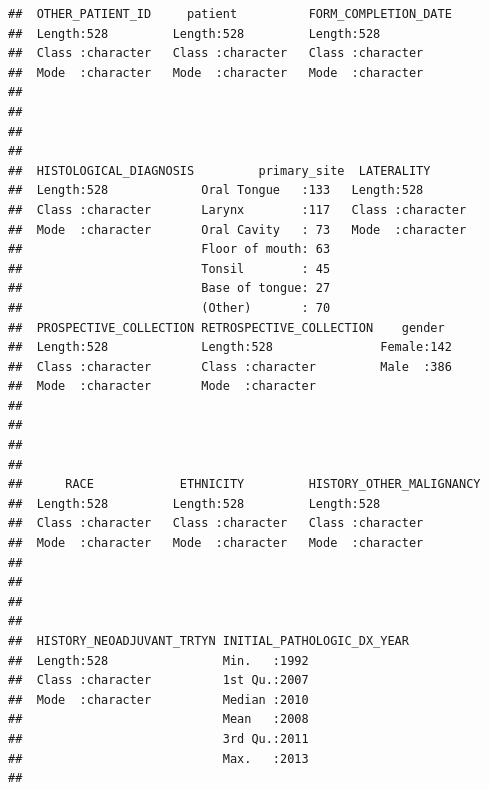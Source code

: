 \documentclass[
  11pt,
]{article}
\begin{document}
\begin{verbatim}
##  OTHER_PATIENT_ID     patient          FORM_COMPLETION_DATE
##  Length:528         Length:528         Length:528          
##  Class :character   Class :character   Class :character    
##  Mode  :character   Mode  :character   Mode  :character    
##                                                            
##                                                            
##                                                            
##                                                            
##  HISTOLOGICAL_DIAGNOSIS         primary_site  LATERALITY       
##  Length:528             Oral Tongue   :133   Length:528        
##  Class :character       Larynx        :117   Class :character  
##  Mode  :character       Oral Cavity   : 73   Mode  :character  
##                         Floor of mouth: 63                     
##                         Tonsil        : 45                     
##                         Base of tongue: 27                     
##                         (Other)       : 70                     
##  PROSPECTIVE_COLLECTION RETROSPECTIVE_COLLECTION    gender   
##  Length:528             Length:528               Female:142  
##  Class :character       Class :character         Male  :386  
##  Mode  :character       Mode  :character                     
##                                                              
##                                                              
##                                                              
##                                                              
##      RACE            ETHNICITY         HISTORY_OTHER_MALIGNANCY
##  Length:528         Length:528         Length:528              
##  Class :character   Class :character   Class :character        
##  Mode  :character   Mode  :character   Mode  :character        
##                                                                
##                                                                
##                                                                
##                                                                
##  HISTORY_NEOADJUVANT_TRTYN INITIAL_PATHOLOGIC_DX_YEAR
##  Length:528                Min.   :1992              
##  Class :character          1st Qu.:2007              
##  Mode  :character          Median :2010              
##                            Mean   :2008              
##                            3rd Qu.:2011              
##                            Max.   :2013              
##                                                      

\end{verbatim}
\end{document}
